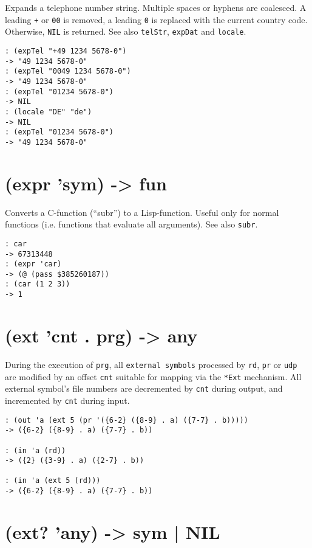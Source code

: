 {{{{{Expands a telephone number string. Multiple spaces or hyphens are
coalesced. A leading \texttt{+} or \texttt{00} is removed, a leading \texttt{0} is replaced
with the current country code. Otherwise, \texttt{NIL} is returned. See also
\texttt{telStr}, \texttt{expDat} and \texttt{locale}.


\begin{verbatim}
: (expTel "+49 1234 5678-0")
-> "49 1234 5678-0"
: (expTel "0049 1234 5678-0")
-> "49 1234 5678-0"
: (expTel "01234 5678-0")
-> NIL
: (locale "DE" "de")
-> NIL
: (expTel "01234 5678-0")
-> "49 1234 5678-0"
\end{verbatim}

 
\section{(expr 'sym) -> fun}
\label{sec-8-1-5-16}


Converts a C-function (``subr'') to a Lisp-function. Useful only for
normal functions (i.e. functions that evaluate all arguments). See also
\texttt{subr}.


\begin{verbatim}
: car
-> 67313448
: (expr 'car)
-> (@ (pass $385260187))
: (car (1 2 3))
-> 1
\end{verbatim}

 
\section{(ext 'cnt . prg) -> any}
\label{sec-8-1-5-17}


During the execution of \texttt{prg}, all \texttt{external symbols} processed by \texttt{rd},
\texttt{pr} or \texttt{udp} are modified by an offset \texttt{cnt} suitable for mapping via
the \texttt{*Ext} mechanism. All external symbol's file numbers are decremented
by \texttt{cnt} during output, and incremented by \texttt{cnt} during input.


\begin{verbatim}
: (out 'a (ext 5 (pr '({6-2} ({8-9} . a) ({7-7} . b)))))
-> ({6-2} ({8-9} . a) ({7-7} . b))

: (in 'a (rd))
-> ({2} ({3-9} . a) ({2-7} . b))

: (in 'a (ext 5 (rd)))
-> ({6-2} ({8-9} . a) ({7-7} . b))
\end{verbatim}

 
\section{(ext? 'any) -> sym | NIL}
\label{sec-8-1-5-18}


}}}}}
